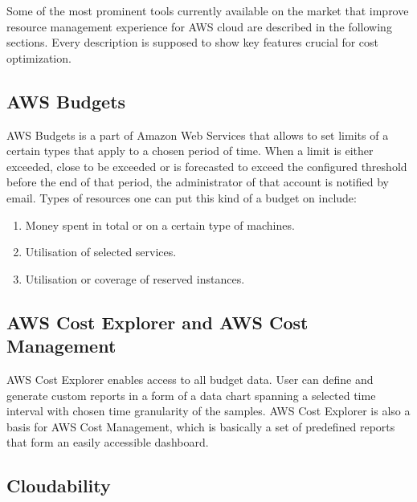 \documentclass[licencjacka,en]{thesisclass}
\begin{document}
    Some of the most prominent tools currently available on the market that improve resource management experience for AWS cloud are described in the following sections. Every description is supposed to show key features crucial for cost optimization.

    \subsection{AWS Budgets}

    AWS Budgets is a part of Amazon Web Services that allows to set limits of a certain types
    that apply to a chosen period of time.
    When a limit is either exceeded, close to be exceeded or is forecasted to exceed the configured threshold
    before the end of that period, the administrator of that account is notified by email.
    Types of resources one can put this kind of a budget on include:

    \begin{enumerate}
        \item Money spent in total or on a certain type of machines.
        \item Utilisation of selected services.
        \item Utilisation or coverage of reserved instances.
    \end{enumerate}
    \begin{flushright}
        \cite{AWSDocs}
    \end{flushright}

    \subsection{AWS Cost Explorer and AWS Cost Management}

    AWS Cost Explorer enables access to all budget data.
    User can define and generate custom reports in a form of a data chart spanning a selected time interval with chosen time granularity of the samples.
    AWS Cost Explorer is also a basis for AWS Cost Management, which is basically a set of predefined reports that form an easily accessible dashboard.

    \subsection{Cloudability}
\end{document}
